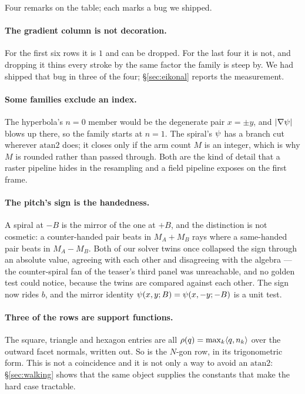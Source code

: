 Four remarks on the table; each marks a bug we shipped.

\paragraph{The gradient column is not decoration.} For the first six rows it is
$1$ and can be dropped. For the last four it is not, and dropping it thins every
stroke by the same factor the family is steep by. We had shipped that bug in
three of the four; \S\ref{sec:eikonal} reports the measurement.

\paragraph{Some families exclude an index.} The hyperbola's $n=0$ member would be
the degenerate pair $x=\pm y$, and $\lvert\nabla\psi\rvert$ blows up there, so the
family starts at $n=1$. The spiral's $\psi$ has a branch cut wherever
$\mathrm{atan2}$ does; it closes only if the arm count $M$ is an integer, which is
why $M$ is rounded rather than passed through. Both are the kind of detail that a
raster pipeline hides in the resampling and a field pipeline exposes on the
first frame.

\paragraph{The pitch's sign is the handedness.} A spiral at $-B$ is the mirror
of the one at $+B$, and the distinction is not cosmetic: a counter-handed pair
beats in $M_A+M_B$ rays where a same-handed pair beats in $M_A-M_B$. Both of
our solver twins once collapsed the sign through an absolute value, agreeing
with each other and disagreeing with the algebra --- the counter-spiral fan of
the teaser's third panel was unreachable, and no golden test could notice,
because the twins are compared against each other. The sign now rides $b$,
and the mirror identity $\psi(x,y;B)=\psi(x,-y;-B)$ is a unit test.

\paragraph{Three of the rows are support functions.} The square, triangle and
hexagon entries are all $\rho(q)=\max_k\langle q,n_k\rangle$ over the outward
facet normals, written out. So is the $N$-gon row, in its trigonometric form. This
is not a coincidence and it is not only a way to avoid an $\mathrm{atan2}$:
\S\ref{sec:walking} shows that the same object supplies the constants that make
the hard case tractable.

